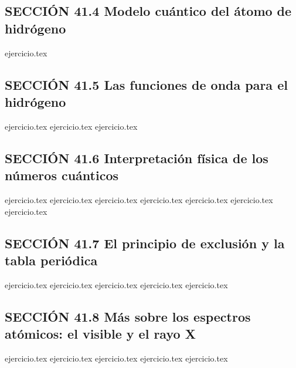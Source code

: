 \subsection*{SECCIÓN 41.4 Modelo cuántico del átomo de hidrógeno}
\begin{enumerate}
    \setcounter{enumi}{13}
    {ejercicio.tex}
\end{enumerate}

\subsection*{SECCIÓN 41.5 Las funciones de onda para el hidrógeno}
\begin{enumerate}
    \setcounter{enumi}{14}
    {ejercicio.tex}
    {ejercicio.tex}
    {ejercicio.tex}
\end{enumerate}

\subsection*{SECCIÓN 41.6 Interpretación física de los números cuánticos}
\begin{enumerate}
    \setcounter{enumi}{17}
    {ejercicio.tex}
    {ejercicio.tex}
    {ejercicio.tex}
    {ejercicio.tex}
    {ejercicio.tex}
    {ejercicio.tex}
    {ejercicio.tex}
\end{enumerate}

\subsection*{SECCIÓN 41.7 El principio de exclusión y la tabla periódica}
\begin{enumerate}
    \setcounter{enumi}{24}
    {ejercicio.tex}
    {ejercicio.tex}
    {ejercicio.tex}
    {ejercicio.tex}
    {ejercicio.tex}
\end{enumerate}

\subsection*{SECCIÓN 41.8 Más sobre los espectros atómicos: el visible y el rayo X}
\begin{enumerate}
    \setcounter{enumi}{29}
    {ejercicio.tex}
    {ejercicio.tex}
    {ejercicio.tex}
    {ejercicio.tex}
    {ejercicio.tex}
\end{enumerate}

